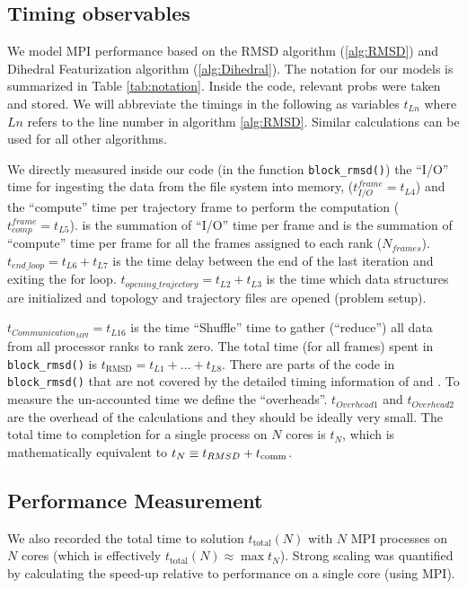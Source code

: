 \label{methods}

\subsection{Timing observables}
We model MPI performance based on the RMSD algorithm (\ref{alg:RMSD}) and Dihedral Featurization algorithm (\ref{alg:Dihedral}). 
The notation for our models is summarized in Table \ref{tab:notation}.
Inside the code, relevant probs were taken and stored. 
We will abbreviate the timings in the following as variables $t_{Ln}$ where $Ln$ refers to the line number in algorithm \ref{alg:RMSD}.
Similar calculations can be used for all other algorithms.

We directly measured inside our code (in the function \texttt{block\_rmsd()}) the ``I/O'' time for
ingesting the data from the file system into memory, ($t_{I/O}^{frame} = t_{L4}$) and the ``compute'' time per
trajectory frame to perform the computation ($t_{comp}^{frame} = t_{L5}$). 
 \tIO is the summation of ``I/O'' time per frame and \tcomp is the summation of ``compute'' time per frame for all the frames assigned to each rank ($N_{frames}$). 
$t_{end\_loop} = t_{L6}+t_{L7}$ is the time delay between the end of the last iteration and exiting the for loop.
$t_{opening\_trajectory} = t_{L2}+t_{L3}$ is the time which data structures are initialized and topology and trajectory files are opened (problem setup).

$t_{Communication_{MPI}} = t_{L16}$ is the time ``Shuffle'' time to gather (``reduce'') all data from all processor ranks to rank zero.
The total time (for all frames) spent in \texttt{block\_rmsd()} is $t_{\text{RMSD}} = t_{L1} + ...+ t_{L8}$. 
There are parts of the code in \texttt{block\_rmsd()} that are not covered by the detailed timing information of \tcomp and \tIO. 
To measure the un-accounted time we define the ``overheads''.
$t_{Overhead1}$ and $t_{Overhead2}$ are the overhead of the calculations and they should be ideally very small.  
The total time to completion for a single process on $N$ cores is $t_{N}$, which is mathematically equivalent to
$t_{N} \equiv t_{RMSD} + t_{\text{comm}}$.

\subsection{Performance Measurement}
We also recorded the total time to solution $t_{\text{total}}(N)$ with $N$ MPI processes on $N$ cores (which is effectively
$t_{\text{total}}(N) \approx \max t_{N}$). 
Strong scaling was quantified by calculating the speed-up relative to performance on a single core (using MPI).


